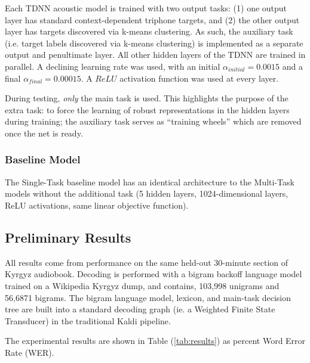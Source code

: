 \documentclass[a4paper]{article}
\begin{document}
Each TDNN acoustic model is trained with two output tasks: (1) one output layer has standard context-dependent triphone targets, and (2) the other output layer has targets discovered via k-means clustering. As such, the auxiliary task (i.e. target labels discovered via k-means clustering) is implemented as a separate output and penultimate layer. All other hidden layers of the TDNN are trained in parallel. A declining learning rate was used, with an initial $\alpha_{initial}=0.0015$ and a final $\alpha_{final}=0.00015$. A $ReLU$ activation function was used at every layer.

During testing, \textit{only} the main task is used. This highlights the purpose of the extra task: to force the learning of robust representations in the hidden layers during training; the auxiliary task serves as ``training wheels'' which are removed once the net is ready.


\subsubsection{Baseline Model}

The Single-Task baseline model has an identical architecture to the Multi-Task models without the additional task (5 hidden layers, 1024-dimensional layers, ReLU activations, same linear objective function).



\subsection{Preliminary Results}


All results come from performance on the same held-out 30-minute section of Kyrgyz audiobook. Decoding is performed with a bigram backoff language model trained on a Wikipedia Kyrgyz dump, and contains, 103,998 unigrams and 56,6871 bigrams. The bigram language model, lexicon, and main-task decision tree are built into a standard decoding graph (ie. a Weighted Finite State Transducer) in the traditional Kaldi pipeline. 

The experimental results are shown in Table (\ref{tab:results}) as percent Word Error Rate (WER).
\end{document}
